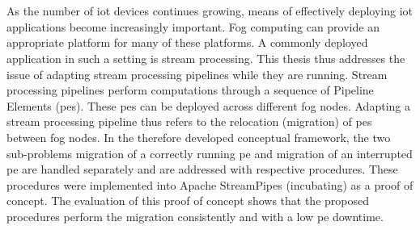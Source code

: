 \thispagestyle{empty}\section*{}

As the number of \acrfull{iot} devices continues growing, means of effectively deploying \gls{iot} applications become increasingly important. Fog computing can provide an appropriate platform for many of these platforms. A commonly deployed application in such a setting is stream processing. This thesis thus addresses the issue of adapting stream processing pipelines while they are running. Stream processing pipelines perform computations through a sequence of Pipeline Elements (\acrshort{pe}s). These \acrshort{pe}s can be deployed across different fog nodes. Adapting a stream processing pipeline thus refers to the relocation (migration) of \acrshort{pe}s between fog nodes. In the therefore developed conceptual framework, the two sub-problems migration of a correctly running \acrshort{pe} and migration of an interrupted \acrshort{pe} are handled separately and are addressed with respective procedures. These procedures were implemented into Apache StreamPipes (incubating) as a proof of concept. The evaluation of this proof of concept shows that the proposed procedures perform the migration consistently and with a low \acrshort{pe} downtime.







